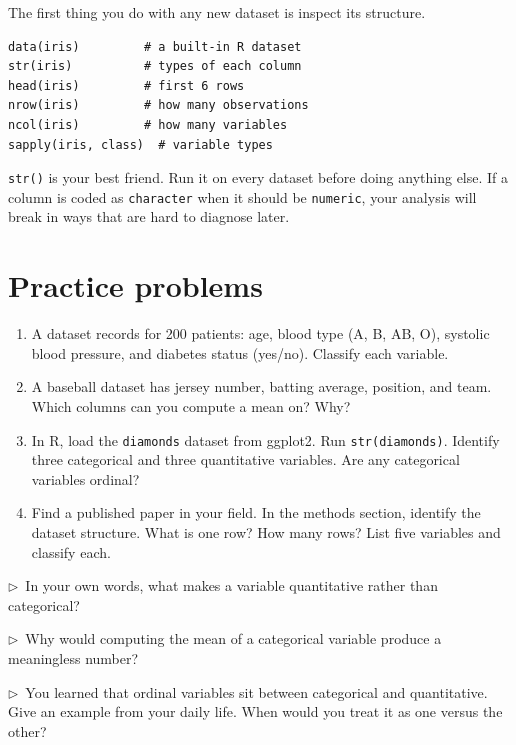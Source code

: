 \begin{codelab}
The first thing you do with any new dataset is inspect its structure.
\begin{lstlisting}[language=Rlang]
data(iris)         # a built-in R dataset
str(iris)          # types of each column
head(iris)         # first 6 rows
nrow(iris)         # how many observations
ncol(iris)         # how many variables
sapply(iris, class)  # variable types
\end{lstlisting}
\texttt{str()} is your best friend. Run it on every dataset before doing anything else. If a column is coded as \texttt{character} when it should be \texttt{numeric}, your analysis will break in ways that are hard to diagnose later.
\end{codelab}

\section{Practice problems}

\begin{enumerate}
  \item A dataset records for 200 patients: age, blood type (A, B, AB, O), systolic blood pressure, and diabetes status (yes/no). Classify each variable.

  \item A baseball dataset has jersey number, batting average, position, and team. Which columns can you compute a mean on? Why?

  \item In R, load the \texttt{diamonds} dataset from ggplot2. Run \texttt{str(diamonds)}. Identify three categorical and three quantitative variables. Are any categorical variables ordinal?

  \item Find a published paper in your field. In the methods section, identify the dataset structure. What is one row? How many rows? List five variables and classify each.
\end{enumerate}

\begin{reflect}
$\triangleright$~In your own words, what makes a variable quantitative rather than categorical?

\smallskip
$\triangleright$~Why would computing the mean of a categorical variable produce a meaningless number?

\smallskip
$\triangleright$~You learned that ordinal variables sit between categorical and quantitative. Give an example from your daily life. When would you treat it as one versus the other?
\end{reflect}

